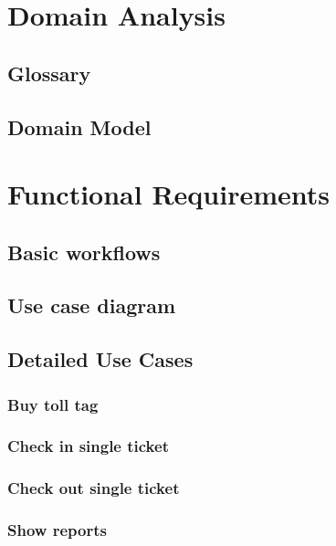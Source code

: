 \section {Domain Analysis}
\subsection{Glossary}


\subsection{Domain Model}


\section{Functional Requirements}
\subsection{Basic workflows}

\subsection{Use case diagram}

\subsection{Detailed Use Cases}
\subsubsection{Buy toll tag} \label{sec:use_case_buy_toll_tag}

\subsubsection{Check in single ticket} \label{sec:use_case_check_in_single_ticket}

\subsubsection{Check out single ticket} \label{sec:use_case_check_out_single_ticket}

\subsubsection{Show reports} \label{sec:use_case_show_reports}

